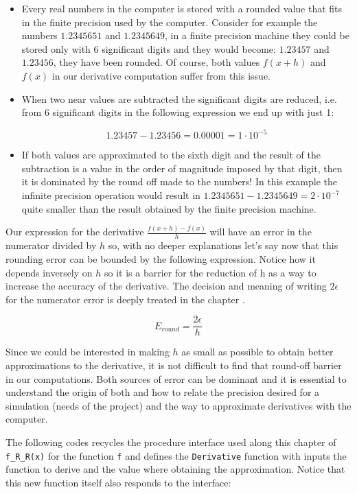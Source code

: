 \begin{itemize}
    \item Every real numbers in the computer is stored with a rounded value that fits in the finite precision used by the computer. Consider for example the numbers $1.2345651$ and $1.2345649$, in a finite precision machine they could be stored only with 6 significant digits and they would become: $1.23457$ and $1.23456$, they have been rounded. Of course, both values $f(x+h)$ and $f(x)$ in our derivative computation suffer from this issue.
    
    \item When two near values are subtracted the significant digits are reduced, i.e. from 6 significant digits in the following expression we end up with just 1: 
    
    $$
    1.23457 - 1.23456 = 0.00001 = 1\cdot 10^{-5}
    $$
    
    \item If both values are approximated to the sixth digit and the result of the subtraction is a value in the order of magnitude imposed by that digit, then it is dominated by the round off made to the numbers!
     In this example the infinite precision operation would result in $1.2345651 - 1.2345649 = 2\cdot 10^{-7}$ quite smaller than the result obtained by the finite precision machine. 
\end{itemize}

Our expression for the derivative $\frac{f(x+h)-f(x)}{h}$ will have an error in the numerator divided by $h$ so, with no deeper explanations let's say now that this rounding error can be bounded by the following expression. Notice how it depends inversely on $h$ so it is a barrier for the reduction of h as a way to increase the accuracy of the derivative. The decision and meaning of writing $2\epsilon$ for the numerator error is deeply treated in the chapter \label{chap:reals}.  

$$
E_{round} = \frac{2\epsilon}{h}
$$

Since we could be interested in making $h$ as small as possible to obtain better approximations to the derivative, it is not difficult to find that round-off barrier in our computations. Both sources of error can be dominant and it is essential to understand the origin of both and how to relate the precision desired for a simulation (needs of the project) and the way to approximate derivatives with the computer. 

The following codes recycles the procedure interface used along this chapter of \texttt{f\_R\_R(x)} for the function \texttt{f} and defines the \texttt{Derivative} function with inputs the function to derive and the value where obtaining the approximation. Notice that this new function itself also responds to the interface:


